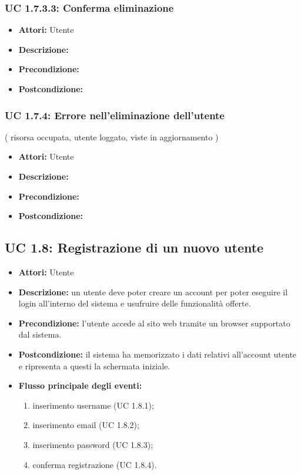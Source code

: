 \subsubsection{UC 1.7.3.3: Conferma eliminazione}

\begin{itemize}
\item \textbf{Attori:} Utente
\item \textbf{Descrizione:} 
\item \textbf{Precondizione:} 
\item \textbf{Postcondizione:} 
\end{itemize}

\subsubsection{UC 1.7.4: Errore nell’eliminazione dell'utente}
( risorsa occupata, utente loggato, viste in aggiornamento )

\begin{itemize}
\item \textbf{Attori:} Utente
\item \textbf{Descrizione:} 
\item \textbf{Precondizione:} 
\item \textbf{Postcondizione:} 
\end{itemize}

\subsection{UC 1.8: Registrazione di un nuovo utente}

\begin{itemize}
\item \textbf{Attori:} Utente
\item \textbf{Descrizione:} un utente deve poter creare un account per poter eseguire il login
all’interno del sistema e usufruire delle funzionalità offerte.
\item \textbf{Precondizione:} l'utente accede al sito web tramite un browser supportato
dal sistema.
\item \textbf{Postcondizione:} il sistema ha memorizzato i dati relativi all’account utente e
ripresenta a questi la schermata iniziale.
\item \textbf{Flusso principale degli eventi:}

\begin{enumerate}
\item inserimento username (UC 1.8.1);
\item inserimento email (UC 1.8.2);
\item inserimento password (UC 1.8.3);
\item conferma registrazione (UC 1.8.4).
\end{enumerate}

\end{itemize}

